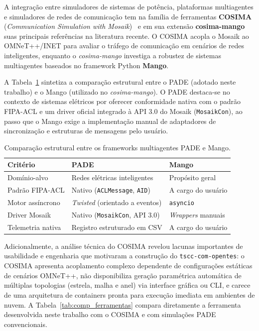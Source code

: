 \documentclass[10pt,twocolumn,a4paper]{article}
\begin{document}
A integração entre simuladores de sistemas de potência, plataformas multiagentes e simuladores de redes de comunicação tem na família de ferramentas \textbf{COSIMA} (\textit{Communication Simulation with Mosaik})~\cite{prost2021cosima} e em sua extensão \textbf{cosima-mango}~\cite{schrage2023cosimamango} suas principais referências na literatura recente. O COSIMA acopla o Mosaik ao OMNeT++/INET para avaliar o tráfego de comunicação em cenários de redes inteligentes, enquanto o \textit{cosima-mango} investiga a robustez de sistemas multiagentes baseados no framework Python \textbf{Mango}.

A Tabela~\ref{tab:pade_mango} sintetiza a comparação estrutural entre o PADE (adotado neste trabalho) e o Mango (utilizado no \textit{cosima-mango}). O PADE destaca-se no contexto de sistemas elétricos por oferecer conformidade nativa com o padrão FIPA-ACL e um driver oficial integrado à API 3.0 do Mosaik (\texttt{MosaikCon}), ao passo que o Mango exige a implementação manual de adaptadores de sincronização e estruturas de mensagens pelo usuário.

\begin{table}[H]
\centering
\caption{Comparação estrutural entre os frameworks multiagentes PADE e Mango.}
\label{tab:pade_mango}
\footnotesize
\begin{tabularx}{\columnwidth}{@{}lXX@{}}
\toprule
\textbf{Critério} & \textbf{PADE~\cite{melo2019pade}} & \textbf{Mango~\cite{schrage2023cosimamango}} \\
\midrule
Domínio-alvo & Redes elétricas inteligentes & Propósito geral \\
Padrão FIPA-ACL & Nativo (\texttt{ACLMessage}, \texttt{AID}) & A cargo do usuário \\
Motor assíncrono & \textit{Twisted} (orientado a eventos) & \texttt{asyncio} \\
Driver Mosaik & Nativo (\texttt{MosaikCon}, API 3.0) & \textit{Wrappers} manuais \\
Telemetria nativa & Registro estruturado em CSV & A cargo do usuário \\
\bottomrule
\end{tabularx}
\end{table}

Adicionalmente, a análise técnica do COSIMA revelou lacunas importantes de usabilidade e engenharia que motivaram a construção do \texttt{tscc-com-opentes}: o COSIMA apresenta acoplamento complexo dependente de configurações estáticas de cenários OMNeT++, não disponibiliza geração paramétrica automática de múltiplas topologias (estrela, malha e anel) via interface gráfica ou CLI, e carece de uma arquitetura de containers pronta para execução imediata em ambientes de nuvem. A Tabela~\ref{tab:comp_ferramentas} compara diretamente a ferramenta desenvolvida neste trabalho com o COSIMA e com simulações PADE convencionais.
\end{document}
